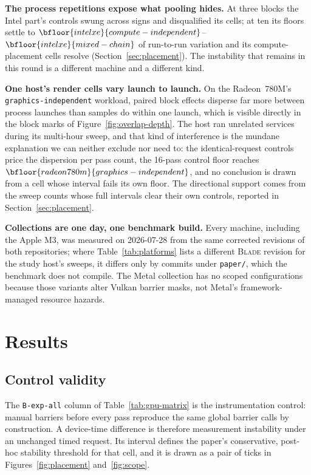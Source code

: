 \documentclass[10pt,twocolumn]{article}
\newcommand{\blade}{\textsc{Blade}}
\begin{document}
\textbf{The process repetitions expose what pooling hides.} At three blocks
the Intel part's controls swung across signs and disqualified its cells; at
ten its floors settle to
$\bfloor{intelxe}{compute-independent}$--$\bfloor{intelxe}{mixed-chain}$ of
run-to-run variation and its compute-placement cells resolve
(Section~\ref{sec:placement}). The instability that remains in this round is
a different machine and a different kind.

\textbf{One host's render cells vary launch to launch.} On the Radeon~780M's
\texttt{graphics-independent} workload, paired block effects disperse far
more between process launches than samples do within one launch, which is
visible directly in the block marks of Figure~\ref{fig:overlap-depth}. The
host ran unrelated services during its multi-hour sweep, and that kind of
interference is the mundane explanation we can neither exclude nor need to:
the identical-request controls price the dispersion per pass count, the
16-pass control floor reaches
$\bfloor{radeon780m}{graphics-independent}$, and no conclusion is drawn from
a cell whose interval fails its own floor. The directional support comes from
the sweep counts whose full intervals clear their own controls, reported in
Section~\ref{sec:placement}.

\hostcaveat

\textbf{Collections are one day, one benchmark build.} Every machine,
including the Apple M3, was measured on 2026-07-28 from the same corrected
revisions of both repositories; where Table~\ref{tab:platforms} lists a
different \blade{} revision for the study host's sweeps, it differs only by
commits under \texttt{paper/}, which the benchmark does not compile. The
Metal collection has no scoped configurations because those variants alter
Vulkan barrier masks, not Metal's framework-managed resource hazards.

\section{Results}

\subsection{Control validity}

The \texttt{B-exp-all} column of Table~\ref{tab:gpu-matrix} is the
instrumentation control: manual barriers before every pass reproduce the same
global barrier calls by construction. A device-time difference is therefore
measurement instability under an unchanged timed request. Its interval defines
the paper's conservative, post-hoc stability threshold for that cell, and it is
drawn as a pair of ticks in
Figures~\ref{fig:placement} and~\ref{fig:scope}.
\end{document}
